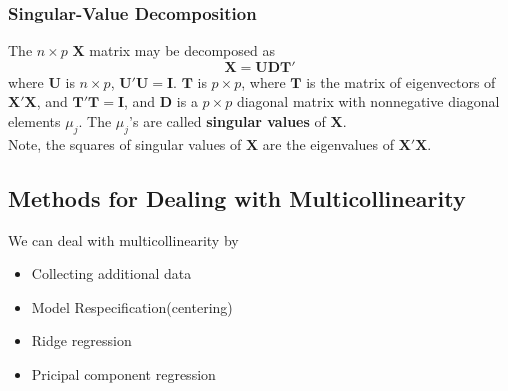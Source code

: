 \documentclass[11pt]{article}
\theoremstyle{definition}
\begin{document}
\subsubsection{Singular-Value Decomposition}
The $n\times p$ $\bm{X}$ matrix may be decomposed as
\[
\bm{X}=\bm{UDT}'
\]
where $\bm{U}$ is $n\times p$, $\bm{U}'\bm{U}=\bm{I}$. $\bm{T}$ is $p\times p$, where $\bm{T}$ is the matrix of eigenvectors of $\bm{X}'\bm{X}$, and $\bm{T}'\bm{T}=\bm{I}$, and $\bm{D}$ is a $p\times p$ diagonal matrix with nonnegative diagonal elements $\mu_j$. The $\mu_j$'s are called \textbf{singular values} of $\bm{X}$.\\
Note, the squares of singular values of $\bm{X}$ are the eigenvalues of $\bm{X}'\bm{X}$.
\subsection{Methods for Dealing with Multicollinearity}
We can deal with multicollinearity by
\begin{itemize}
  \item Collecting additional data
  \item Model Respecification(centering)
  \item Ridge regression
  \item Pricipal component regression
\end{itemize}
\end{document}
